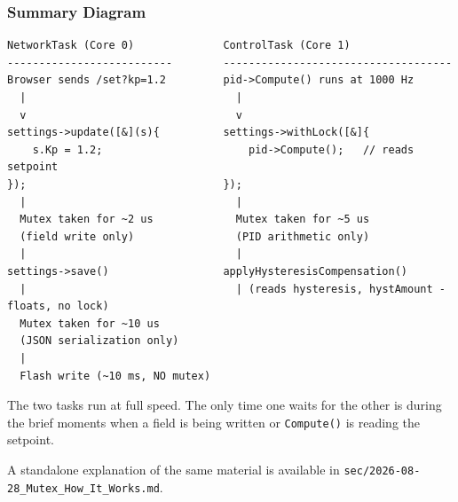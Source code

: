 \subsubsection{Summary Diagram}

\begin{verbatim}
NetworkTask (Core 0)              ControlTask (Core 1)
--------------------------        ------------------------------------
Browser sends /set?kp=1.2         pid->Compute() runs at 1000 Hz
  |                                 |
  v                                 v
settings->update([&](s){          settings->withLock([&]{
    s.Kp = 1.2;                       pid->Compute();   // reads setpoint
});                               });
  |                                 |
  Mutex taken for ~2 us             Mutex taken for ~5 us
  (field write only)                (PID arithmetic only)
  |                                 |
settings->save()                  applyHysteresisCompensation()
  |                                 | (reads hysteresis, hystAmount - floats, no lock)
  Mutex taken for ~10 us
  (JSON serialization only)
  |
  Flash write (~10 ms, NO mutex)
\end{verbatim}

The two tasks run at full speed. The only time one waits for the other is during the
brief moments when a field is being written or \texttt{Compute()} is reading the setpoint.

A standalone explanation of the same material is available in
\texttt{sec/2026-08-28\_Mutex\_How\_It\_Works.md}.
